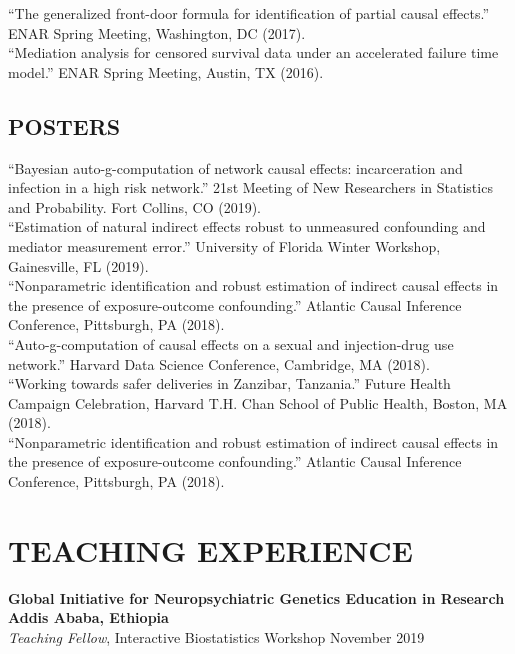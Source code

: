 \documentclass[12pt]{article}
\begin{document}
``The generalized front-door formula for identification of partial causal effects.'' ENAR Spring Meeting, Washington, DC (2017). \\

``Mediation analysis for censored survival data under an accelerated failure time model.'' ENAR Spring Meeting, Austin, TX (2016). 

\subsection*{\textbf{ POSTERS}}

``Bayesian auto-g-computation of network causal effects: incarceration and infection in a high risk network.'' 21st Meeting of New Researchers in 
Statistics and Probability. Fort Collins, CO (2019). \\

``Estimation of natural indirect effects robust to unmeasured confounding and mediator measurement error.'' University of Florida Winter Workshop, Gainesville, FL (2019). \\

``Nonparametric identification and robust estimation of indirect causal effects in the presence of exposure-outcome confounding.'' Atlantic Causal Inference Conference, Pittsburgh, PA (2018). \\

``Auto-g-computation of causal effects on a sexual and injection-drug use network.'' Harvard Data Science Conference, Cambridge, MA (2018). \\

``Working towards safer deliveries in Zanzibar, Tanzania.'' Future Health Campaign Celebration, Harvard T.H. Chan School of Public Health, Boston, MA (2018). \\

``Nonparametric identification and robust estimation of indirect causal effects in the presence of exposure-outcome confounding.'' Atlantic Causal Inference Conference, Pittsburgh, PA (2018). 



\section*{\textbf{{\large T}{EACHING} {\large E}{XPERIENCE}}}
\textbf{Global Initiative for Neuropsychiatric Genetics Education in Research \hfill \hfill Addis Ababa, Ethiopia} \\
\textit{Teaching Fellow}, Interactive Biostatistics Workshop \hfill \hfill November 2019 \\
\end{document}
